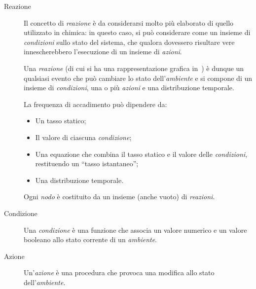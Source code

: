 \begin{description}
      \item[Reazione]\label{itm:react}
        Il concetto di \emph{reazione} è da considerarsi molto più elaborato di quello utilizzato in chimica:
        in questo caso, si può considerare come un insieme di \emph{condizioni} sullo stato del sistema, che qualora dovessero risultare vere innescherebbero l'esecuzione di un insieme di \emph{azioni}.

        Una \emph{reazione} (di cui si ha una rappresentazione grafica in~) è dunque un qualsiasi evento che può cambiare lo stato dell'\emph{ambiente} e si compone di un insieme di \emph{condizioni}, una o più \emph{azioni} e una distribuzione temporale.

        La frequenza di accadimento può dipendere da:
        \begin{itemize}
            \item Un tasso statico;
            \item Il valore di ciascuna \emph{condizione};
            \item Una equazione che combina il tasso statico e il valore delle \emph{condizioni}, restituendo un ``tasso istantaneo'';
            \item Una distribuzione temporale.
        \end{itemize}

        Ogni \emph{nodo} è costituito da un insieme (anche vuoto) di \emph{reazioni}.

      \item[Condizione]\label{itm:cond}
        Una \emph{condizione} è una funzione che associa un valore numerico e un valore booleano allo stato corrente di un \emph{ambiente}.

      \item[Azione]\label{itm:act}
        Un'\emph{azione} è una procedura che provoca una modifica allo stato dell'\emph{ambiente}.

      \end{description}

